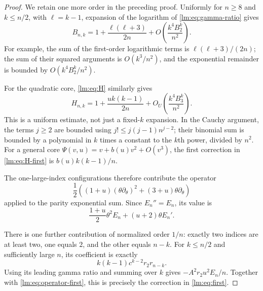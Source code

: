 \begin{proof}
We retain one more order in the preceding proof.  Uniformly for
$n\geq8$ and $k\leq n/2$, with $\ell=k-1$, expansion of the logarithm of
\eqref{lm:eq:gamma-ratio} gives
\begin{equation}\label{lm:eq:gamma-first}
 B_{n,k}=1+\frac{\ell(\ell+3)}{2n}
             +O\!\left(\frac{k^4B_2^k}{n^2}\right).
\end{equation}
For example, the sum of the first-order logarithmic terms is
$\ell(\ell+3)/(2n)$; the sum of their squared arguments is
$O(k^3/n^2)$, and the exponential remainder is bounded by
$O(k^4B_2^k/n^2)$.

For the quadratic core, \eqref{lm:eq:H} similarly gives
\begin{equation}\label{lm:eq:H-first}
 H_{n,k}=1+\frac{uk(k-1)}{2n}
              +O_U\!\left(\frac{k^4B_3^k}{n^2}\right).
\end{equation}
This is a uniform estimate, not just a fixed-$k$ expansion.  In the
Cauchy argument, the terms $j\geq2$ are bounded using
$j!\leq j(j-1)n^{j-2}$; their binomial sum is bounded by a polynomial
in $k$ times a constant to the $k$th power, divided by $n^2$.
For a general core $\Psi(v,u)=v+b(u)v^2+O(v^3)$, the first correction
in \eqref{lm:eq:H-first} is $b(u)k(k-1)/n$.

The one-large-index configurations therefore contribute the operator
\[
 \frac12\left((1+u)(\theta\partial_\theta)^2
                    +(3+u)\theta\partial_\theta\right)
\]
applied to the parity exponential sum.  Since $E_n''=E_n$, its value is
\begin{equation}\label{lm:eq:operator-first}
 \frac{1+u}{2}\theta^2E_n+(u+2)\theta E_n'.
\end{equation}

There is one further contribution of normalized order $1/n$: exactly
two indices are at least two, one equals $2$, and the other equals
$n-k$.  For $k\leq n/2$ and sufficiently large $n$, its coefficient
is exactly
\[
 k(k-1)c^{k-2}r_2r_{n-k}.
\]
Using its leading gamma ratio and summing over $k$ gives
$-A^2r_2u^2E_n/n$.  Together with \eqref{lm:eq:operator-first}, this
is precisely the correction in \eqref{lm:eq:first}.


\end{proof}
